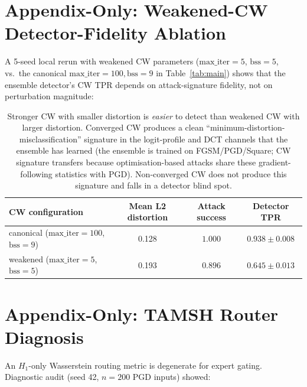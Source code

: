 
\section{Appendix-Only: Weakened-CW Detector-Fidelity Ablation}
\label{app:weak_cw}

A 5-seed local rerun with weakened CW parameters ($\text{max\_iter}=5$,
$\text{bss}=5$, vs.\ the canonical $\text{max\_iter}=100, \text{bss}=9$
in Table~\ref{tab:main}) shows that the ensemble detector's CW TPR depends
on attack-signature fidelity, not on perturbation magnitude:

\begin{table}[h]
\centering
\small
\begin{tabular}{lccc}
\toprule
CW configuration & Mean L2 distortion & Attack success & Detector TPR \\
\midrule
canonical ($\text{max\_iter}=100$, $\text{bss}=9$) & 0.128 & $1.000$ & $\mathbf{0.938 \pm 0.008}$ \\
weakened ($\text{max\_iter}=5$, $\text{bss}=5$)    & 0.193 & $0.896$ & $0.645 \pm 0.013$ \\
\bottomrule
\end{tabular}
\caption{Stronger CW with smaller distortion is \emph{easier} to detect
than weakened CW with larger distortion. Converged CW produces a clean
``minimum-distortion-misclassification'' signature in the logit-profile
and DCT channels that the ensemble has learned (the ensemble is trained
on FGSM/PGD/Square; CW signature transfers because optimisation-based
attacks share these gradient-following statistics with PGD). Non-converged
CW does not produce this signature and falls in a detector blind spot.}
\label{tab:weak_cw}
\end{table}


\section{Appendix-Only: TAMSH Router Diagnosis}
\label{app:tamsh_diag}

An $H_1$-only Wasserstein routing metric is degenerate for expert
gating. Diagnostic audit (seed 42, $n=200$ PGD inputs) showed:

